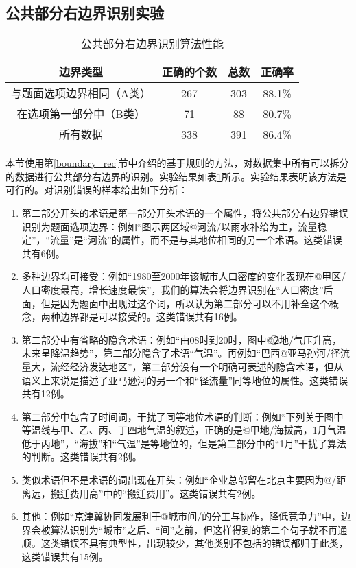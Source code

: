 \documentclass[master, winfont]{njuthesis}
\begin{document}
\subsection{公共部分右边界识别实验}
\begin{table}[!htbp]
	\begin{center}
		\begin{tabular}{c|c|c|c}
			\hline {边界类型} & {正确的个数} & {总数} & {正确率}  \\
			\hline 与题面选项边界相同（A类） & 267 & 303 & 88.1\% \\
			\hline 在选项第一部分中（B类） & 71 & 88 & 80.7\% \\
			\hline 所有数据	& 338 & 391 & 86.4\% \\
			\hline
		\end{tabular}
	\end{center}
	\caption{\label{boundary} 公共部分右边界识别算法性能}
\end{table}
本节使用第\ref{boundary_rec}节中介绍的基于规则的方法，对数据集中所有可以拆分的数据进行公共部分右边界的识别。实验结果如表\ref{boundary}所示。实验结果表明该方法是可行的。对识别错误的样本给出如下分析：
\begin{enumerate}
	\item 第二部分开头的术语是第一部分开头术语的一个属性，将公共部分右边界错误识别为题面选项边界：例如“图示两区域@河流/以雨水补给为主，流量稳定”，“流量”是“河流”的属性，而不是与其地位相同的另一个术语。这类错误共有6例。
	\item 多种边界均可接受：例如“1980至2000年该城市人口密度的变化表现在@甲区/人口密度最高，增长速度最快”，我们的算法会将边界识别在“人口密度”后面，但是因为题面中出现过这个词，所以认为第二部分可以不用补全这个概念，两种边界都是可以接受的。这类错误共有16例。
	\item 第二部分中有省略的隐含术语：例如“由08时到20时，图中@\textcircled{2}地/气压升高，未来呈降温趋势”，第二部分隐含了术语“气温”。再例如“巴西@亚马孙河/径流量大，流经经济发达地区”，第二部分没有一个明确可表述的隐含术语，但从语义上来说是描述了亚马逊河的另一个和“径流量”同等地位的属性。这类错误共有12例。
	\item 第二部分中包含了时间词，干扰了同等地位术语的判断：例如“下列关于图中等温线与甲、乙、丙、丁四地气温的叙述，正确的是@甲地/海拔高，1月气温低于丙地”，“海拔”和“气温”是等地位的，但是第二部分中的“1月”干扰了算法的判断。这类错误共有2例。
	\item 类似术语但不是术语的词出现在开头：例如“企业总部留在北京主要因为@/距离远，搬迁费用高”中的“搬迁费用”。这类错误共有2例。
	\item 其他：例如“京津冀协同发展利于@城市间/的分工与协作，降低竞争力”中，边界会被算法识别为“城市”之后、“间”之前，但这样得到的第二个句子就不再通顺。这类错误不具有典型性，出现较少，其他类别不包括的错误都归于此类，这类错误共有15例。
\end{enumerate}
\end{document}
